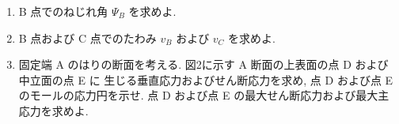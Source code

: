 \begin{enumerate}[label=(\arabic*)]
  \item B 点でのねじれ角 $\Psi_B$ を求めよ.

  \item B 点および C 点でのたわみ $v_B$ および $v_C$ を求めよ.

  \item 固定端 A のはりの断面を考える. 図2に示す A 断面の上表面の点 D および中立面の点 E に
        生じる垂直応力およびせん断応力を求め, 点 D および点 E のモールの応力円を示せ.
        点 D および点 E の最大せん断応力および最大主応力を求めよ.
\end{enumerate}
